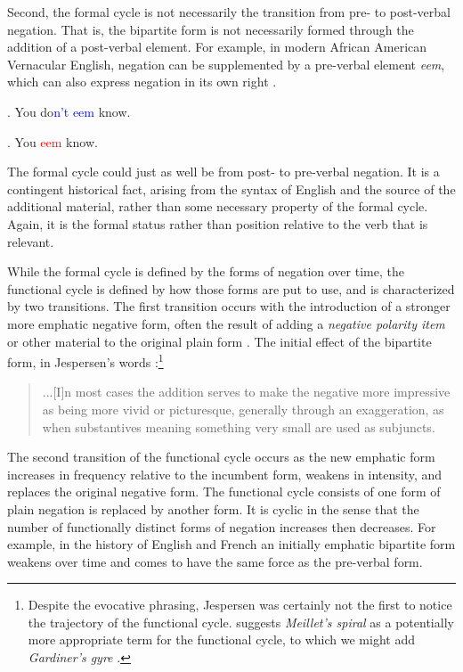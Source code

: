 \documentclass[linguex]{sp}
\theoremstyle{definition} \newtheorem{definition}{Definition}
\begin{document}
Second, the formal cycle is not necessarily the transition from pre- to post-verbal negation. That is, the bipartite form is not necessarily formed through the addition of a post-verbal element. For example, in modern African American Vernacular English, negation can be supplemented by a pre-verbal element \emph{eem}, which can also express negation in its own right \citep{jones2015, jones2015toward}.

\ex. You do\textcolor{blue}{n't eem} know.

\ex. You \textcolor{red}{eem} know.

The formal cycle could just as well be from post- to pre-verbal negation. It is a contingent historical fact, arising from the syntax of  English and the source of the additional material, rather than some necessary property of the formal cycle. Again, it is the formal status rather than position relative to the verb that is relevant.

While the formal cycle is defined by the forms of negation over time, the functional cycle is defined by how those forms are put to use, and is characterized by two transitions.  The first transition occurs with the introduction of a stronger more emphatic negative form, often the result of adding a \emph{negative polarity item} or other material to the original plain form \citep{horn:1989, givon1978, croft1991}. The initial effect of the bipartite form, in Jespersen's words \citeyearpar[15]{jespersen:1917}:\footnote{Despite the evocative phrasing, Jespersen was certainly not the first to notice the trajectory of the functional cycle. \cite{vanderAuwera2009} suggests \emph{Meillet's spiral} \citeyearpar[394]{meillet1912} as a potentially more appropriate term for the functional cycle, to which we might add \emph{Gardiner's gyre} \citeyearpar[134]{gardiner1904}.}

\begin{quotation}
...[I]n most cases the addition serves to make the negative more impressive as being more vivid or picturesque, generally through an exaggeration, as when substantives meaning something very small are used as subjuncts.
\end{quotation}

The second transition of the functional cycle occurs as the new emphatic form increases in frequency relative to the incumbent form, weakens in intensity, and replaces the original negative form. The functional cycle consists of one form of plain negation is replaced by another form. It is cyclic in the sense that the number of functionally distinct forms of negation increases then decreases. For example, in the history of English and French an initially emphatic bipartite form weakens over time and comes to have the same force as the pre-verbal form.
\end{document}

